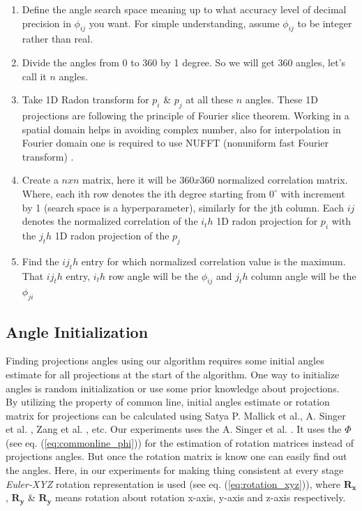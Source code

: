 \documentclass[twoside]{iitbreport}
\begin{document}
\begin{enumerate}
    \item Define the angle search space meaning up to what accuracy level of decimal precision in ${\phi_{ij}}$ you want. For simple understanding, assume ${\phi_{ij}}$ to be integer rather than real. 
    \item Divide the angles from 0 to 360 by 1 degree. So we will get 360 angles, let's call it ${n}$ angles.
    \item Take 1D Radon transform for ${p_i}$ \& ${p_j}$ at all these ${n}$ angles. These 1D projections are following the principle of Fourier slice theorem. Working in a spatial domain helps in avoiding complex number, also for interpolation in Fourier domain one is required to use NUFFT (nonuniform fast Fourier transform) \cite{fessler2003NUFFT}.
        
     \item Create a ${nxn}$ matrix, here it will be ${360x360}$ normalized correlation matrix. Where, each ith row denotes the ith degree starting from $0^{\circ}$  with increment by 1 (search space is a hyperparameter), similarly for the jth column. Each $ij$ denotes the normalized correlation of the ${i_th}$ 1D radon projection for ${p_i}$  with the ${j_th}$ 1D  radon projection of the ${p_j}$   
    
    \item Find the $ij_th$ entry for which normalized correlation value is the maximum. That  $ij_th$ entry, ${i_th}$ row angle will be the $\phi_{ij}$ and ${j_th}$ column angle will be the $\phi_{ji}$
\end{enumerate}

\subsection{Angle Initialization}\label{subsec: angle_initialization}
Finding projections angles using our algorithm requires some initial angles estimate for all projections at the start of the algorithm. One way to initialize angles is random initialization or use some prior knowledge about projections.\\ 
 
 By utilizing the property of common line, initial angles estimate or rotation matrix for projections can be calculated using Satya P. Mallick et al.\cite{mallick2006structure}, A. Singer et al. \cite{singer2009threeAngleEstimate} \cite{sigworthcryoAngleEstimate}, Zang et al. \cite{wang2018improvingAngleEstimate}, etc.  Our experiments uses the A. Singer et al. \cite{singer2009threeAngleEstimate}. It uses the ${\Phi}$ (see eq. (\ref{eq:commonline_phi})) for the estimation of rotation matrices instead of projections angles. But once the rotation matrix is know one can easily find out the angles. Here, in our experiments for making thing consistent at every stage \textit{Euler-XYZ} rotation representation is used (see eq. (\ref{eq:rotation_xyz})), where ${\boldsymbol{R_x}}$, ${\boldsymbol{R_y}}$ \& ${\boldsymbol{R_y}}$ means rotation about rotation x-axis, y-axis and z-axis respectively.
 
\end{document}
